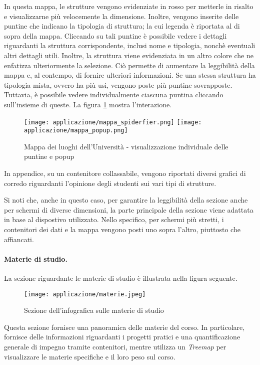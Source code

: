 In questa mappa, le strutture vengono evidenziate in rosso per metterle in risalto e visualizzarne più velocemente la dimensione.
Inoltre, vengono inserite delle puntine che indicano la tipologia di struttura; la cui legenda è riportata al di sopra della mappa.
Cliccando su tali puntine è possibile vedere i dettagli riguardanti la struttura corrispondente, inclusi nome e tipologia, nonchè eventuali altri dettagli utili. 
Inoltre, la struttura viene evidenziata in un altro colore che ne enfatizza ulteriormente la selezione.
Ciò permette di aumentare la leggibilità della mappa e, al contempo, di fornire ulteriori informazioni.
Se una stessa struttura ha tipologia mista, ovvero ha più usi, vengono poste più puntine sovrapposte. Tuttavia, è possibile vedere individualmente ciascuna puntina 
cliccando sull'insieme di queste.
La figura \ref{fig:app_mappa_interazione} mostra l'interazione.
\begin{figure}[H] 
    \centering 
    \texttt{[image: applicazione/mappa\_spiderfier.png]} 
    \texttt{[image: applicazione/mappa\_popup.png]} 
    \caption{Mappa dei luoghi dell'Università - visualizzazione individuale delle puntine e popup}
    \label{fig:app_mappa_interazione}
\end{figure}

In appendice, su un contenitore collassabile, vengono riportati diversi grafici di corredo riguardanti l'opinione degli studenti sui vari tipi di strutture.

\bigskip
\noindent Si noti che, anche in questo caso, per garantire la leggibilità della sezione anche per schermi di diverse dimensioni, la parte principale della sezione viene adattata 
in base al dispostivo utilizzato. Nello specifico, per schermi più stretti, i contenitori dei dati e la mappa vengono posti uno sopra l'altro, piuttosto che affiancati.

\paragraph{Materie di studio.} La sezione riguardante le materie di studio è illustrata nella figura seguente. 
\begin{figure}[H] 
    \centering 
    \texttt{[image: applicazione/materie.jpeg]} 
    \caption{Sezione dell'infografica sulle materie di studio}
    \label{fig:app_materie}
\end{figure}
\noindent Questa sezione fornisce una panoramica delle materie del corso. In particolare, fornisce delle informazioni riguardanti i progetti pratici e una quantificazione generale di impegno 
tramite contenitori, mentre utilizza un \emph{Treemap} per visualizzare le materie specifiche e il loro peso sul corso.

